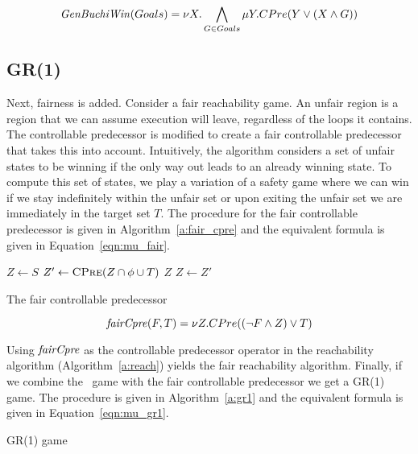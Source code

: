 \begin{equation}
    \mathit{GenBuchiWin}(Goals) = \nu X. \bigwedge_{G \in Goals} \mu Y. CPre(Y \vee (X \wedge G))
\label{eqn:mu_genbuchi}
\end{equation}

\subsection{GR(1)}

Next, fairness is added. Consider a fair reachability game. An unfair region is a region that we can assume execution will leave, regardless of the loops it contains. The controllable predecessor is modified to create a fair controllable predecessor that takes this into account. Intuitively, the algorithm considers a set of unfair states to be winning if the only way out leads to an already winning state. To compute this set of states, we play a variation of a safety game where we can win if we stay indefinitely within the unfair set or upon exiting the unfair set we are immediately in the target set $T$. The procedure for the fair controllable predecessor is given in Algorithm~\ref{a:fair_cpre} and the equivalent \mucalc formula is given in Equation~\ref{eqn:mu_fair}. 

\begin{algorithm}[t]
\begin{algorithmic}
\State $Z \gets S$
\Loop
\State $Z' \gets \Call{CPre}{Z \cap \phi \cup T}$
\State\Return $Z$\EndIf
\State $Z \gets Z'$
\EndLoop
\EndFunction
\end{algorithmic}
\caption{The fair controllable predecessor}
\label{a:fair_cpre}
\end{algorithm}

\begin{equation}
    \mathit{fairCpre}(F, T) = \nu Z. CPre((\neg F \wedge Z) \vee T)
\label{eqn:mu_fair}
\end{equation}

Using $\mathit{fairCpre}$ as the controllable predecessor operator in the reachability algorithm (Algorithm~\ref{a:reach}) yields the fair reachability algorithm. Finally, if we combine the \buchi\ game with the fair controllable predecessor we get a GR(1) game. The procedure is given in Algorithm~\ref{a:gr1} and the equivalent \mucalc formula is given in Equation~\ref{eqn:mu_gr1}.

\begin{algorithm}[t]
\begin{algorithmic}
\State\Return {}
\EndFunction
\end{algorithmic}
\caption{GR(1) game}
\label{a:gr1}
\end{algorithm}

